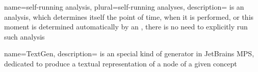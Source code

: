 {
  name=self-running analysis,
  plural=self-running analyses,
  description={ is an analysis, which determines itself the point of time, when it is performed, or this moment is determined automatically
  by an ,   there is no need to explicitly run such analysis}
}


{
  name=TextGen,
  description={ is an special kind of generator in JetBrains MPS, dedicated to produce a textual representation of a node of a given concept}
}
